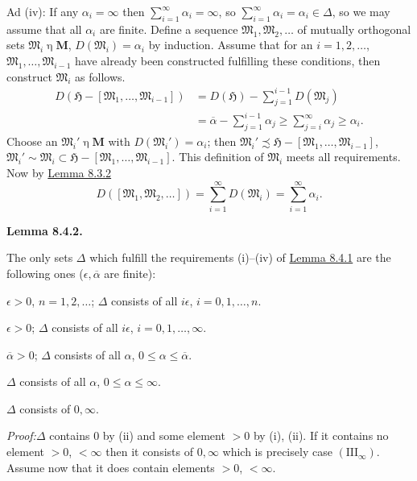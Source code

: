 \documentclass[12pt,b5paper,twoside]{article}
\newcommand{\Hspace}{\mathfrak H}
\newcommand{\M}{\mathbf M}
\newcommand{\Lemma}[1]{%
  \par\smallskip\noindent\phantomsection\label{lem:#1}\textbf{Lemma #1.}\enspace
}
\newcommand{\Proof}{\par\noindent\textit{Proof:}\enspace}
\newcommand{\lemref}[1]{\hyperref[lem:#1]{Lemma #1}}
\begin{document}
Ad (iv): If any $\alpha_i=\infty$ then
$\sum_{i=1}^{\infty}\alpha_i=\infty$, so
$\sum_{i=1}^{\infty}\alpha_i=\alpha_i\in\Delta$, so we may assume that all
$\alpha_i$ are finite. Define a sequence $\mathfrak M_1,\mathfrak M_2,\ldots$
of mutually orthogonal sets $\mathfrak M_i\mathbin\eta\M$,
$D(\mathfrak M_i)=\alpha_i$ by induction. Assume that for an
$i=1,2,\ldots$, $\mathfrak M_1,\ldots,\mathfrak M_{i-1}$ have already been
constructed fulfilling these conditions, then construct $\mathfrak M_i$ as
follows.
\begin{align*}
 D(\Hspace-[\mathfrak M_1,\ldots,\mathfrak M_{i-1}])
 &=D(\Hspace)-\sum_{j=1}^{i-1}D(\mathfrak M_j)\\
 &=\overline\alpha-\sum_{j=1}^{i-1}\alpha_j
 \geq\sum_{j=i}^{\infty}\alpha_j\geq\alpha_i.
\end{align*}
Choose an $\mathfrak M_i'\mathbin\eta\M$ with
$D(\mathfrak M_i')=\alpha_i$; then
$\mathfrak M_i'\precsim\Hspace-[\mathfrak M_1,\ldots,\mathfrak M_{i-1}]$,
$\mathfrak M_i'\sim\mathfrak M_i\subset
\Hspace-[\mathfrak M_1,\ldots,\mathfrak M_{i-1}]$. This definition of
$\mathfrak M_i$ meets all requirements. Now by \lemref{8.3.2}
\[
 D([\mathfrak M_1,\mathfrak M_2,\ldots])
 =\sum_{i=1}^{\infty}D(\mathfrak M_i)
 =\sum_{i=1}^{\infty}\alpha_i.
\]

\Lemma{8.4.2}
The only sets $\Delta$ which fulfill the requirements (i)--(iv) of
\lemref{8.4.1} are the following ones ($\epsilon,\overline\alpha$ are finite):
\begin{description}[style=multiline,leftmargin=4.4em]
\item[$(\mathrm I_n)$] $\epsilon>0$, $n=1,2,\ldots$;
  $\Delta$ consists of all $i\epsilon$, $i=0,1,\ldots,n$.
\item[$(\mathrm I_\infty)$] $\epsilon>0$;
  $\Delta$ consists of all $i\epsilon$, $i=0,1,\ldots,\infty$.
\item[$(\mathrm{II}_1)$] $\overline\alpha>0$;
  $\Delta$ consists of all $\alpha$, $0\leq\alpha\leq\overline\alpha$.
\item[$(\mathrm{II}_\infty)$] $\Delta$ consists of all $\alpha$,
  $0\leq\alpha\leq\infty$.
\item[$(\mathrm{III}_\infty)$] $\Delta$ consists of $0,\infty$.
\end{description}

\Proof $\Delta$ contains $0$ by (ii) and some element $>0$ by (i), (ii). If it
contains no element $>0$, $<\infty$ then it consists of $0,\infty$ which is
precisely case $(\mathrm{III}_\infty)$. Assume now that it does contain
elements $>0$, $<\infty$.
\end{document}
